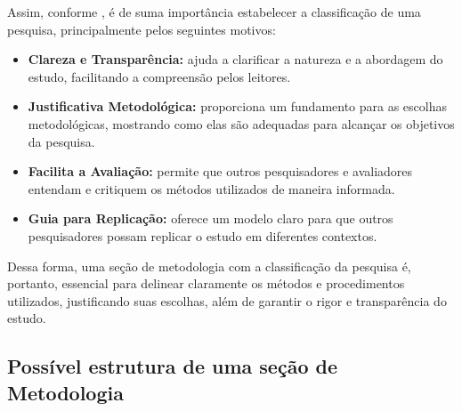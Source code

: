 
\newpage

Assim, conforme , é de suma importância estabelecer a classificação de uma pesquisa, principalmente pelos seguintes motivos:
\begin{itemize}[nosep, leftmargin=2.3cm]
    \item \textbf{Clareza e Transparência:} ajuda a clarificar a natureza e a abordagem do estudo, facilitando a compreensão pelos leitores.
    \item \textbf{Justificativa Metodológica:} proporciona um fundamento para as escolhas metodológicas, mostrando como elas são adequadas para alcançar os objetivos da pesquisa.
    \item \textbf{Facilita a Avaliação:} permite que outros pesquisadores e avaliadores entendam e critiquem os métodos utilizados de maneira informada.
    \item \textbf{Guia para Replicação:} oferece um modelo claro para que outros pesquisadores possam replicar o estudo em diferentes contextos.
\end{itemize}

Dessa forma, uma seção de metodologia com a classificação da pesquisa é, portanto, essencial para delinear claramente os métodos e procedimentos utilizados, justificando suas escolhas, além de garantir o rigor e transparência do estudo.

\subsection{Possível estrutura de uma seção de Metodologia}

